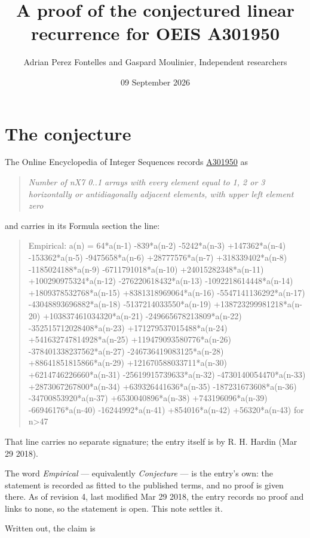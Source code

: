 \documentclass[11pt]{article}
\title{A proof of the conjectured linear recurrence for OEIS A301950}
\author{Adrian Perez Fontelles and Gaspard Moulinier, Independent researchers}
\date{09 September 2026}
\theoremstyle{definition}
\begin{document}
\maketitle
\section{The conjecture}

The Online Encyclopedia of Integer Sequences records \href{https://oeis.org/A301950}{A301950} as

\begin{quote}\itshape Number of nX7 0..1 arrays with every element equal to 1, 2 or 3 horizontally or antidiagonally adjacent elements, with upper left element zero\end{quote}

and carries in its Formula section the line:

\begin{quote}\ttfamily Empirical: a(n) = 64*a(n-1) -839*a(n-2) -5242*a(n-3) +147362*a(n-4) -153362*a(n-5) -9475658*a(n-6) +28777576*a(n-7) +318339402*a(n-8) -1185024188*a(n-9) -6711791018*a(n-10) +24015282348*a(n-11) +100290975324*a(n-12) -276220618432*a(n-13) -1092218614448*a(n-14) +1809378532768*a(n-15) +8381318969064*a(n-16) -5547141136292*a(n-17) -43048893696882*a(n-18) -5137214033550*a(n-19) +138723299981218*a(n-20) +103837461034320*a(n-21) -249665678213809*a(n-22) -352515712028408*a(n-23) +171279537015488*a(n-24) +541632747814928*a(n-25) +119479093580776*a(n-26) -378401338237562*a(n-27) -246736419083125*a(n-28) +88641851815866*a(n-29) +121670588033711*a(n-30) +6214746226660*a(n-31) -25619915739633*a(n-32) -4730140054470*a(n-33) +2873067267800*a(n-34) +639326441636*a(n-35) -187231673608*a(n-36) -34700853920*a(n-37) +6530040896*a(n-38) +743196096*a(n-39) -66946176*a(n-40) -16244992*a(n-41) +854016*a(n-42) +56320*a(n-43) for n>47\end{quote}

That line carries no separate signature; the entry itself is by R. H. Hardin (Mar 29 2018).

The word {\itshape Empirical} --- equivalently {\itshape Conjecture} --- is the entry's own: the statement is recorded as fitted to the published terms, and no proof is given there. As of revision 4, last modified Mar 29 2018, the entry records no proof and links to none, so the statement is open. This note settles it.

Written out, the claim is
\end{document}
